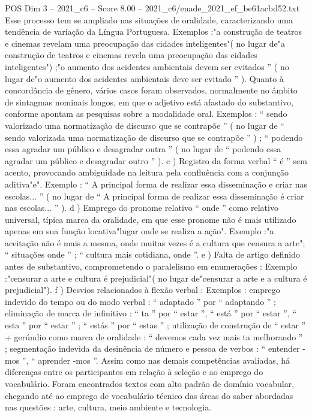 \begin{textsample}{POS Dim 3 – 2021\_c6 – Score 8.00 – 2021\_c6/enade\_2021\_ef\_be61acbd52.txt}
Esse processo tem se ampliado nas situações de oralidade, caracterizando uma tendência de variação da Língua Portuguesa.
Exemplos :"a construção de teatros e cinemas revelam uma preocupação das cidades inteligentes"( no lugar de"a construção de teatros e cinemas revela uma preocupação das cidades inteligentes") ;"o aumento dos acidentes ambientais devem ser evitados ” ( no lugar de"o aumento dos acidentes ambientais deve ser evitado ” ).
Quanto à concordância de gênero, vários casos foram observados, normalmente no âmbito de sintagmas nominais longos, em que o adjetivo está afastado do substantivo, conforme apontam as pesquisas sobre a modalidade oral.
Exemplos : “ sendo valorizado uma normatização de discurso que se contrapõe ” ( no lugar de “ sendo valorizada uma normatização de discurso que se contrapõe ” ) ; “ podendo essa agradar um público e desagradar outra ” ( no lugar de “ podendo essa agradar um público e desagradar outro ” ). c ) Registro da forma verbal “ é ” sem acento, provocando ambiguidade na leitura pela confluência com a conjunção aditiva"e".
Exemplo : “ A principal forma de realizar essa disseminação e criar nas escolas... ” ( no lugar de “ A principal forma de realizar essa disseminação é criar nas escolas... ” ). d ) Emprego do pronome relativo “ onde ” como relativo universal, típica marca da oralidade, em que esse pronome não é mais utilizado apenas em sua função locativa"lugar onde se realiza a ação".
Exemplo :"a aceitação não é mais a mesma, onde muitas vezes é a cultura que censura a arte"; “ situações onde ” ; “ cultura mais cotidiana, onde ”. e ) Falta de artigo definido antes de substantivo, comprometendo o paralelismo em enumerações : Exemplo :"censurar a arte e cultura é prejudicial"( no lugar de"censurar a arte e a cultura é prejudicial"). f ) Desvios relacionados à flexão verbal : Exemplos : emprego indevido do tempo ou do modo verbal : “ adaptado ” por “ adaptando ” ; eliminação de marca de infinitivo : “ ta ” por “ estar ”, “ está ” por “ estar ”, “ esta ” por “ estar ” ; “ estás ” por “ estas ” ; utilização de construção de “ estar ” + gerúndio como marca de oralidade : “ devemos cada vez mais ta melhorando ” ; segmentação indevida da desinência de número e pessoa de verbos : “ entender -mos ”, “ aprender -mos ”.
Assim como nas demais competências avaliadas, há diferenças entre os participantes em relação à seleção e ao emprego do vocabulário.
Foram encontrados textos com alto padrão de domínio vocabular, chegando até ao emprego de vocabulário técnico das áreas do saber abordadas nas questões : arte, cultura, meio ambiente e tecnologia.

\end{textsample}
